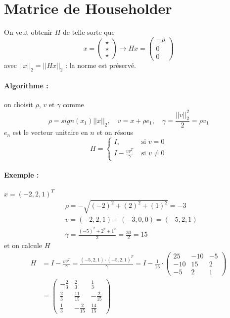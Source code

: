 \documentclass[11pt,a4paper]{report}
\begin{document}
\section{Matrice de Householder}

On veut obtenir $H$ de telle sorte que
$$
x = \begin{pmatrix}
\star \\ \star \\ \star
\end{pmatrix}
\rightarrow
Hx = \begin{pmatrix}
-\rho \\ 0 \\ 0
\end{pmatrix}
$$
avec $||x||_2 = ||Hx||_2$ : la norme est préservé.

\paragraph*{Algorithme : } on choisit $\rho$, $v$ et $\gamma$ comme
$$
\rho = sign(x_1)||x||_2, \quad v = x + \rho e_1,\quad \gamma = \frac{||v||^2_2}{2} = \rho v_1
$$
$e_n$ est le vecteur unitaire en $n$ et on résous
$$
H = \begin{cases}
I, &\text{ si } v = 0 \\
I - \frac{vv^T}{\gamma} &\text{ si }v \neq 0
\end{cases}
$$

\paragraph*{Exemple : } $x=(-2,2,1)^T$
\begin{align*}
&\rho = -\sqrt{(-2)^2 + (2)^2 + (1)^2} = -3 \\
& v = (-2,2,1) + (-3,0,0) = (-5,2,1) \\
& \gamma = \frac{(-5)^2+2^2+1^2}{2} = \frac{30}{2} = 15
\end{align*}
et on calcule $H$
\begin{align*}
H &= I - \frac{vv^T}{\gamma} = \frac{(-5,2,1) \cdot (-5,2,1)^T}{\gamma} = I - 
\frac{1}{15} \cdot \begin{pmatrix}
25 & -10 & -5 \\
-10 & 15 & 2 \\
-5 & 2 & 1
\end{pmatrix}\\
&=
\begin{pmatrix}
-\frac{2}{3} & \frac{2}{3} & \frac{1}{3} \\
\frac{2}{3} & \frac{11}{15} & -\frac{2}{15} \\
\frac{1}{3} & -\frac{2}{15} & \frac{14}{15}
\end{pmatrix}
\end{align*}
\end{document}
